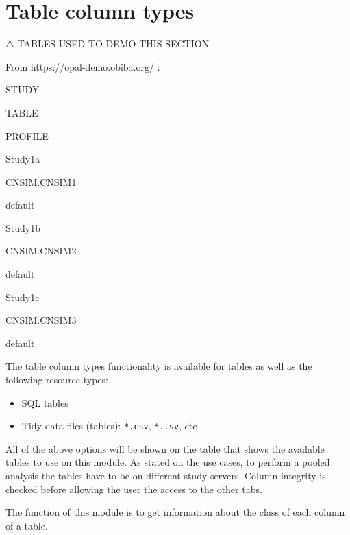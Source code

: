 \documentclass[
]{book}
\providecommand{\tightlist}{%
  \setlength{\itemsep}{0pt}\setlength{\parskip}{0pt}}
\begin{document}
\hypertarget{table-column-types}{%
\section{Table column types}\label{table-column-types}}

⚠️ TABLES USED TO DEMO THIS SECTION

From https://opal-demo.obiba.org/ :

STUDY

TABLE

PROFILE

Study1a

CNSIM.CNSIM1

default

Study1b

CNSIM.CNSIM2

default

Study1c

CNSIM.CNSIM3

default

The table column types functionality is available for tables as well as the following resource types:

\begin{itemize}
\tightlist
\item
  SQL tables
\item
  Tidy data files (tables): \texttt{*.csv}, \texttt{*.tsv}, etc
\end{itemize}

All of the above options will be shown on the table that shows the available tables to use on this module. As stated on the use cases, to perform a pooled analysis the tables have to be on different study servers. Column integrity is checked before allowing the user the access to the other tabs.

The function of this module is to get information about the class of each column of a table.
\end{document}

